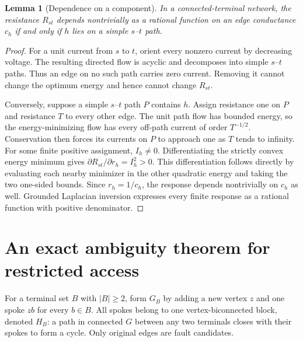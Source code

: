 \documentclass[11pt,letterpaper]{article}
\newtheorem{lemma}[theorem]{Lemma}
\begin{document}
\begin{lemma}[Dependence on a component]\label{lem:dependence}
In a connected-terminal network, the resistance $R_{st}$ depends nontrivially as a rational function on an edge conductance $c_h$ if and only if $h$ lies on a simple $s$--$t$ path.
\end{lemma}
\begin{proof}
For a unit current from $s$ to $t$, orient every nonzero current by decreasing voltage. The resulting directed flow is acyclic and decomposes into simple $s$--$t$ paths. Thus an edge on no such path carries zero current. Removing it cannot change the optimum energy and hence cannot change $R_{st}$.

Conversely, suppose a simple $s$--$t$ path $P$ contains $h$. Assign resistance one on $P$ and resistance $T$ to every other edge. The unit path flow has bounded energy, so the energy-minimizing flow has every off-path current of order $T^{-1/2}$. Conservation then forces its currents on $P$ to approach one as $T$ tends to infinity. For some finite positive assignment, $I_h\ne0$. Differentiating the strictly convex energy minimum gives $\partial R_{st}/\partial r_h=I_h^2>0$. This differentiation follows directly by evaluating each nearby minimizer in the other quadratic energy and taking the two one-sided bounds. Since $r_h=1/c_h$, the response depends nontrivially on $c_h$ as well. Grounded Laplacian inversion expresses every finite response as a rational function with positive denominator.
\end{proof}

\section{An exact ambiguity theorem for restricted access}\label{sec:terminal}
For a terminal set $B$ with $|B|\ge2$, form $G_B$ by adding a new vertex $z$ and one spoke $zb$ for every $b\in B$. All spokes belong to one vertex-biconnected block, denoted $H_B$: a path in connected $G$ between any two terminals closes with their spokes to form a cycle. Only original edges are fault candidates.
\end{document}
